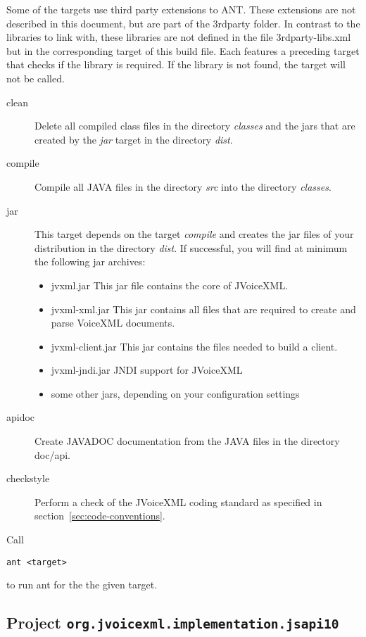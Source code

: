\documentclass[11pt,a4paper]{article}
\begin{document}
Some of the targets use third party extensions to ANT. These 
extensions are not described in this document, but are part of
the 3rdparty folder. In contrast to the libraries to link with,
these libraries are not defined in the file 3rdparty-libs.xml
but in the corresponding target of this build file. Each features
a preceding target that checks if the library is required. If
the library is not found, the target will not be called.

\begin{description}
\item[clean]
Delete all compiled class files in the directory \emph{classes}
and the jars that are created by the \emph{jar} target in the directory 
\emph{dist}.

\item[compile]
 Compile all JAVA files in the directory \emph{src} into the directory
\emph{classes}.

\item[jar]
 This target depends on the target \emph{compile} and creates the jar
files of your distribution in the directory \emph{dist}.
If successful, you will find at minimum the following jar archives:
\begin{itemize}
\item jvxml.jar This jar file contains the core of JVoiceXML.
\item jvxml-xml.jar This jar contains all files that are required
to create and parse VoiceXML documents.
\item jvxml-client.jar This jar contains the files needed to build
a client.
\item jvxml-jndi.jar JNDI support for JVoiceXML
\item some other jars, depending on your configuration settings
\end{itemize}

\item[apidoc]
Create JAVADOC documentation from the JAVA files in the directory
doc/api.
\item[checkstyle]
Perform a check of the JVoiceXML coding standard as specified 
in section~\ref{sec:code-conventions}.
\end{description}

Call
\begin{lstlisting}
ant <target>
\end{lstlisting}
to run ant for the the given target.

\subsection{Project \lstinline{org.jvoicexml.implementation.jsapi10}}
\end{document}
